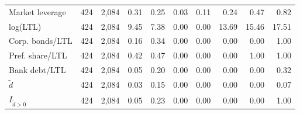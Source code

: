 \begin{threeparttable}
\begin{tabular}{lrrrrrrrrr}
Market leverage & 424 & 2,084 & 0.31 & 0.25 & 0.03 & 0.11 & 0.24 & 0.47 & 0.82 \\
log(LTL) & 424 & 2,084 & 9.45 & 7.38 & 0.00 & 0.00 & 13.69 & 15.46 & 17.51 \\
Corp. bonds/LTL & 424 & 2,084 & 0.16 & 0.34 & 0.00 & 0.00 & 0.00 & 0.00 & 1.00 \\
Pref. share/LTL & 424 & 2,084 & 0.42 & 0.47 & 0.00 & 0.00 & 0.00 & 1.00 & 1.00 \\
Bank debt/LTL & 424 & 2,084 & 0.05 & 0.20 & 0.00 & 0.00 & 0.00 & 0.00 & 0.32 \\
\ensuremath{\tilde{d}} & 424 & 2,084 & 0.03 & 0.15 & 0.00 & 0.00 & 0.00 & 0.00 & 0.07 \\
\ensuremath{I_{\tilde{d}>0}} & 424 & 2,084 & 0.05 & 0.23 & 0.00 & 0.00 & 0.00 & 0.00 & 1.00 \\
\bottomrule\end{tabular}\end{threeparttable}
